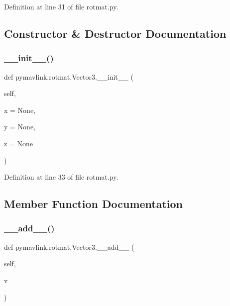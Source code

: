 Definition at line 31 of file rotmat.\+py.



\subsection{Constructor \& Destructor Documentation}
\mbox{\label{classpymavlink_1_1rotmat_1_1Vector3_a74d5a2458dd0c03f178781860aeefe3d}} 
\subsubsection{\texorpdfstring{\_\_init\_\_()}{\_\_init\_\_()}}
{\footnotesize\ttfamily def pymavlink.\+rotmat.\+Vector3.\+\_\+\+\_\+init\+\_\+\+\_\+ (\begin{DoxyParamCaption}\item[{}]{self,  }\item[{}]{x = {\ttfamily None},  }\item[{}]{y = {\ttfamily None},  }\item[{}]{z = {\ttfamily None} }\end{DoxyParamCaption})}



Definition at line 33 of file rotmat.\+py.



\subsection{Member Function Documentation}
\mbox{\label{classpymavlink_1_1rotmat_1_1Vector3_a4e8e0ec45084ca78184bf01a5921d8d5}} 
\subsubsection{\texorpdfstring{\_\_add\_\_()}{\_\_add\_\_()}}
{\footnotesize\ttfamily def pymavlink.\+rotmat.\+Vector3.\+\_\+\+\_\+add\+\_\+\+\_\+ (\begin{DoxyParamCaption}\item[{}]{self,  }\item[{}]{v }\end{DoxyParamCaption})}



